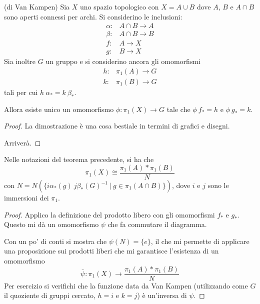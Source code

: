 \begin{thm}(di Van Kampen)
    Sia $X$ uno spazio topologico con $X=A\cup B$ dove $A$, $B$ e $A\cap B$ sono aperti connessi per archi. Si considerino le inclusioni:
    \begin{align*}
        \alpha\colon& A\cap B \longrightarrow A\\
        \beta\colon& A\cap B \longrightarrow B\\
        f\colon& A \longrightarrow X\\
        g\colon& B \longrightarrow X
    \end{align*}
    Sia inoltre $G$ un gruppo e si considerino ancora gli omomorfismi
    \begin{align*}
        h\colon& \pi_1(A)\longrightarrow G\\
        k\colon& \pi_1(B)\longrightarrow G
    \end{align*}
    tali per cui $h\ \alpha_* = k\ \beta_*$.

    Allora esiste unico un omomorfismo $\phi\colon\pi_1(X)\longrightarrow G$ tale che $\phi\ f_* = h$ e $\phi\ g_*=k$.
\end{thm}

\begin{proof}
    La dimostrazione \`e una cosa bestiale in termini di grafici e disegni.

     Arriver\`a.
\end{proof}

\begin{cor}
    Nelle notazioni del teorema precedente, si ha che
    \[
        \pi_1(X)\cong \frac{\pi_1(A) * \pi_1(B)}{N}
    \]
    con $N = N(\{i\alpha_*(g)\ j \beta_*(G)^{-1}\ |\ g\in\pi_1(A\cap B)\})$, dove $i$ e $j$ sono le immersioni dei $\pi_1$.
\end{cor}
\begin{proof}
    Applico la definizione del prodotto libero con gli omomorfismi $f_*$ e $g_*$. Questo mi d\`a un omomorfismo $\psi$ che fa commutare il diagramma.
    \begin{center}\end{center}
    Con un po' di conti si mostra che $\psi(N)=\{e\}$, il che mi permette di applicare una proposizione sui prodotti liberi che mi garantisce l'esistenza di un omomorfismo
    \[
        \bar{\psi}\colon\pi_1(X)\longrightarrow \frac{\pi_1(A) * \pi_1(B)}{N}
    \]
    Per esercizio si verifichi che la funzione data da Van Kampen (utilizzando come $G$ il quoziente di gruppi cercato, $h=i$ e $k=j$) \`e un'inversa di $\psi$.
\end{proof}


